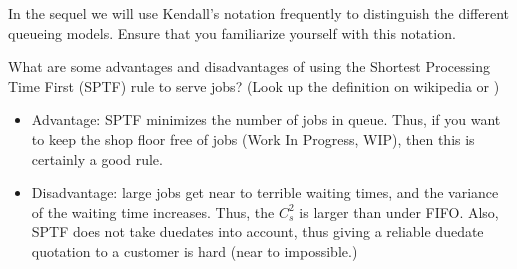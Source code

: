 In the sequel we will use Kendall's notation frequently to distinguish
the different queueing models. Ensure that you familiarize yourself
with this notation.

\begin{question}
  What are some advantages and disadvantages of using the Shortest
  Processing Time First (SPTF) rule to serve jobs? (Look up the
  definition on wikipedia or
  \citet{hall91:_queuein_method_servic_manuf})
  \begin{solution}
  \begin{itemize}
  \item Advantage: SPTF minimizes the number of jobs in queue. Thus,
    if you want to keep the shop floor free of jobs (Work In Progress,
    WIP), then this is certainly a good rule. 
  \item Disadvantage: large jobs get near to terrible waiting times,
    and the variance of the waiting time increases. Thus, the $C_s^2$
    is larger than under FIFO. Also, SPTF does not take duedates into
    account, thus giving a reliable duedate quotation to a customer is
    hard (near to impossible.)
  \end{itemize}
  \end{solution}
\end{question}



